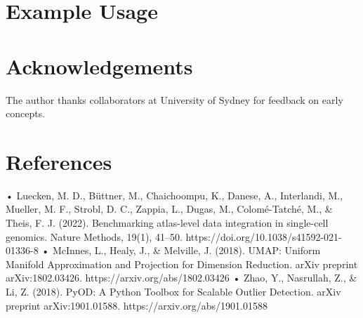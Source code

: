 \section{Example Usage}\label{example-usage}

\begin{Shaded}
\begin{Highlighting}[]

\OtherTok{\textless{}{-}} \NormalTok{()  }
\OtherTok{\textless{}{-}} 
\OtherTok{\textless{}{-}} 
\OtherTok{\textless{}{-}} 
\end{Highlighting}
\end{Shaded}

\section{Acknowledgements}\label{acknowledgements}

The author thanks collaborators at University of Sydney for feedback on
early concepts.

\section{References}\label{references}

• Luecken, M. D., Büttner, M., Chaichoompu, K., Danese, A., Interlandi,
M., Mueller, M. F., Strobl, D. C., Zappia, L., Dugas, M., Colomé-Tatché,
M., \& Theis, F. J. (2022). Benchmarking atlas-level data integration in
single-cell genomics. Nature Methods, 19(1), 41--50.
https://doi.org/10.1038/s41592-021-01336-8 • McInnes, L., Healy, J., \&
Melville, J. (2018). UMAP: Uniform Manifold Approximation and Projection
for Dimension Reduction. arXiv preprint arXiv:1802.03426.
https://arxiv.org/abs/1802.03426 • Zhao, Y., Nasrullah, Z., \& Li, Z.
(2018). PyOD: A Python Toolbox for Scalable Outlier Detection. arXiv
preprint arXiv:1901.01588. https://arxiv.org/abs/1901.01588
